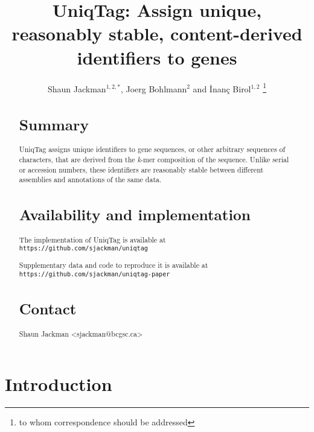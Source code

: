 \documentclass{bioinfo}
\begin{document}

\title{UniqTag: Assign unique, reasonably stable, content-derived
identifiers to genes}
\author{Shaun Jackman$^{1,2,*}$, Joerg Bohlmann$^2$ and \.{I}nan\c{c} Birol$^{1,2}$
\footnote{to whom correspondence should be addressed}}

\address{$^{1}$BC Cancer Agency Genome Sciences Centre
\\ $^{2}$University of British Columbia}



\maketitle

\begin{abstract}
\section{Summary}\label{summary}

UniqTag assigns unique identifiers to gene sequences, or other arbitrary
sequences of characters, that are derived from the \emph{k}-mer
composition of the sequence. Unlike serial or accession numbers, these
identifiers are reasonably stable between different assemblies and
annotations of the same data.

\section{Availability and
implementation}\label{availability-and-implementation}

The implementation of UniqTag is available
at\\\texttt{https://github.com/sjackman/uniqtag}

Supplementary data and code to reproduce it is available
at\\\texttt{https://github.com/sjackman/uniqtag-paper}

\section{Contact}\label{contact}

Shaun Jackman \textless{}sjackman@bcgsc.ca\textgreater{}

\end{abstract}\section{Introduction}\label{introduction}
\end{document}
